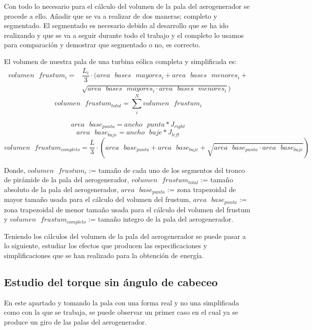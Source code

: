 Con todo lo necesario para el cálculo del volumen de la pala del aerogenerador se procede a ello. Añadir que se va a realizar de dos maneras; completo y segmentado. El segmentado es necesario debido al desarrollo que se ha ido realizando y que se va a seguir durante todo el trabajo y el completo lo usamos para comparación y demostrar que segmentado o no, es correcto.


\begin{definicion}
El volumen de nuestra pala de una turbina eólica completa y simplificada es:
    \begin{align*}
        volumen \text{ } frustum_i = & \dfrac{L_i}{3} \cdot (area \text{ } bases \text{ } mayores_i + area \text{ } bases \text{ } menores_i + \\
        & \sqrt{area \text{ } bases \text{ } mayores_i \cdot area \text{ } bases \text{ } menores_i})
    \end{align*}
$$ volumen \text{ } frustum_{total} = \sum_{i}^{N}volumen \text{ } frustum_i  $$

$$ area \text{ } base_{punta} = ancho \text{ } punta * J_{right} $$
$$ area \text{ } base_{buje} = ancho \text{ } buje * J_{left} $$
$$ volumen \text{ } frustum_{completo} = \dfrac{L}{3} \cdot ( area \text{ } base_{punta} + area \text{ } base_{buje} + \sqrt{area \text{ } base_{punta} \cdot area \text{ } base_{buje}} ) $$


Donde,
\centering $ volumen \text{ } frustum_i $ := tamaño de cada uno de los segmentos del tronco de pirámide de la pala del aerogenerador, $ volumen \text{ } frustum_{total} $ := tamaño absoluto de la pala del aerogenerador, $area \text{ } base_{punta}$ := zona trapezoidal de mayor tamaño usada para el cálculo del volumen del frustum, $area \text{ } base_{punta}$ := zona trapezoidal de menor tamaño usada para el cálculo del volumen del frustum y $ volumen \text{ } frustum_{completo} $ := tamaño integro de la pala del aerogenerador.
\label{def:volumen_tronco_frustum}
\end{definicion}


Teniendo los cálculos del volumen de la pala del aerogenerador se puede pasar a lo siguiente, estudiar los efectos que producen las especificaciones y simplificaciones que se han realizado para la obtención de energía.


\subsection{Estudio del torque sin ángulo de cabeceo}
\label{section:torque_pala_horizontal}
En este apartado y tomando la pala con una forma real y no una simplificada como con la que se trabaja, se puede observar un primer caso en el cual ya se produce un giro de las palas del aerogenerador. \\

